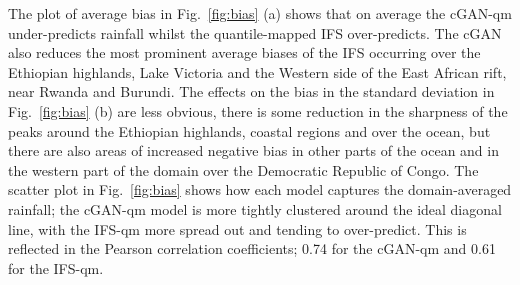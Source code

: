 \documentclass{article}
\begin{document}
The plot of average bias in Fig.~\ref{fig:bias} (a) shows that on average the cGAN-qm under-predicts rainfall whilst the quantile-mapped IFS over-predicts. The cGAN also reduces the most prominent average biases of the IFS occurring over the Ethiopian highlands, Lake Victoria and the Western side of the East African rift, near Rwanda and Burundi. The effects on the bias in the standard deviation in Fig.~\ref{fig:bias} (b) are less obvious, there is some reduction in the sharpness of the peaks around the Ethiopian highlands, coastal regions and over the ocean, but there are also areas of increased negative bias in other parts of the ocean and in the western part of the domain over the Democratic Republic of Congo. The scatter plot in Fig.~\ref{fig:bias} shows how each model captures the domain-averaged rainfall; the cGAN-qm model is more tightly clustered around the ideal diagonal line, with the IFS-qm more spread out and tending to over-predict. This is reflected in the Pearson correlation coefficients; 0.74 for the cGAN-qm and 0.61 for the IFS-qm.
\end{document}
